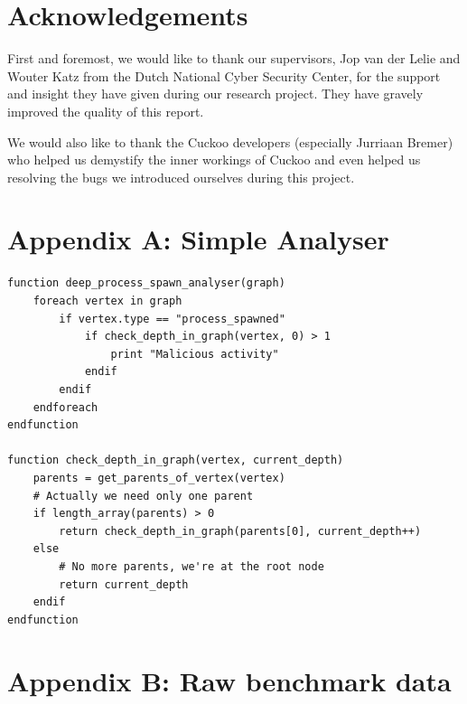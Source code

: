 \documentclass{scrartcl}
\begin{document}
\clearpage

\section*{Acknowledgements}

First and foremost, we would like to thank our supervisors, Jop van der Lelie and Wouter Katz from the Dutch National Cyber Security Center, for the support and insight they have given during our research project. They have gravely improved the quality of this report.

We would also like to thank the Cuckoo developers (especially Jurriaan Bremer) who helped us demystify the inner workings of Cuckoo and even helped us resolving the bugs we introduced ourselves during this project.

\clearpage





\clearpage

\section*{Appendix A: Simple Analyser}


\begin{lstlisting}
function deep_process_spawn_analyser(graph)
    foreach vertex in graph
        if vertex.type == "process_spawned"
            if check_depth_in_graph(vertex, 0) > 1
                print "Malicious activity"
            endif
        endif
    endforeach
endfunction

function check_depth_in_graph(vertex, current_depth)
    parents = get_parents_of_vertex(vertex)
    # Actually we need only one parent
    if length_array(parents) > 0
        return check_depth_in_graph(parents[0], current_depth++)
    else
        # No more parents, we're at the root node
        return current_depth
    endif
endfunction
\end{lstlisting}

\clearpage

\section*{Appendix B: Raw benchmark data}
\end{document}
